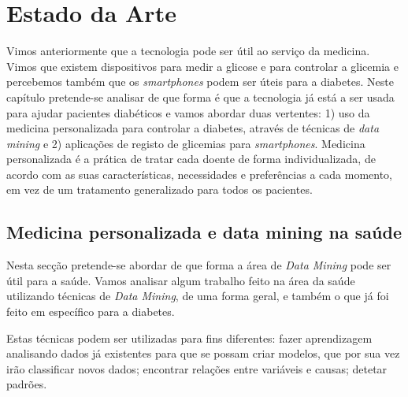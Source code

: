 \chapter{Estado da Arte}\label{chap:stat}

Vimos anteriormente que a tecnologia pode ser útil ao serviço da medicina. Vimos que existem dispositivos para medir a glicose e para controlar a glicemia e percebemos também que os \textit{smartphones} podem ser úteis para a diabetes. Neste capítulo pretende-se analisar de que forma é que a tecnologia já está a ser usada para ajudar pacientes diabéticos e vamos abordar duas vertentes: 1) uso da medicina personalizada para controlar a diabetes, através de técnicas de \textit{data mining} e 2) aplicações de registo de glicemias para \textit{smartphones}.
Medicina personalizada é a prática de tratar cada doente de forma individualizada, de acordo com as suas características, necessidades e preferências a cada momento, em vez de um tratamento generalizado para todos os pacientes.~\cite{personalized}

\section{Medicina personalizada e data mining na saúde}


Nesta secção pretende-se abordar de que forma a área de \textit{Data Mining} pode ser útil para a saúde. Vamos analisar algum trabalho feito na área da saúde utilizando técnicas de \textit{Data Mining}, de uma forma geral, e também o que já foi feito em específico para a diabetes. 

Estas técnicas podem ser utilizadas para fins diferentes: fazer aprendizagem analisando dados já existentes para que se possam criar modelos, que por sua vez irão classificar novos dados; encontrar relações entre variáveis e causas; detetar padrões.


